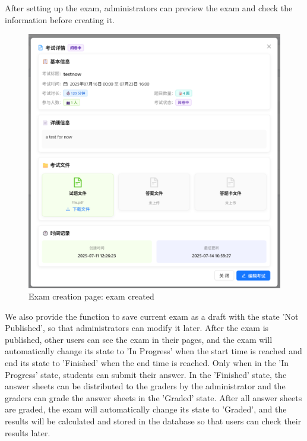 \documentclass[12pt]{article}
\begin{document}
After setting up the exam, administrators can preview the exam and check the information before creating it.
\begin{figure}[H]
    \centering
    \includegraphics[width=\textwidth]{admin/checkexam.png}
    \caption{Exam creation page: exam created}
    \label{fig:ExamCreation page4}
\end{figure}
We also provide the function to save
current exam as a draft with the state 'Not Published', so that administrators can modify it later.
After the exam is published, other users can see the exam in their pages, and the exam will automatically change its state to 'In Progress' when the start time is reached and
end its state to 'Finished' when the end time is reached. Only when in the 'In Progress' state, students can submit their answer.
In the 'Finished' state, the answer sheets can be distributed to the graders by the administrator and the graders can grade the answer sheets in the 'Graded' state.
After all answer sheets are graded, the exam will automatically change its state to 'Graded', and the results will be calculated and stored in the database
so that users can check their results later.
\end{document}
